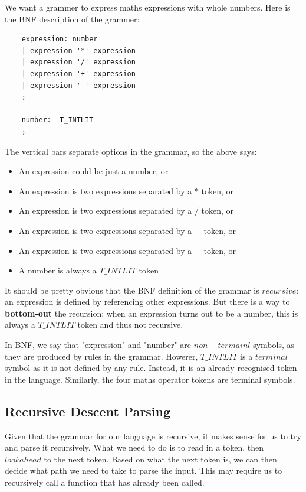 \documentclass[a4paper,12pt]{article}
\begin{document}
We want a grammer to express maths expressions with whole numbers. Here is the BNF description of the grammer:

\begin{lstlisting}
    expression: number
    | expression '*' expression
    | expression '/' expression
    | expression '+' expression
    | expression '-' expression
    ;

    number:  T_INTLIT
    ;
\end{lstlisting}

The vertical bars separate options in the grammar, so the above says:

\begin{itemize}
    \item An expression could be just a number, or
    \item An expression is two expressions separated by a $*$ token, or
    \item An expression is two expressions separated by a $/$ token, or
    \item An expression is two expressions separated by a $+$ token, or
    \item An expression is two expressions separated by a $-$ token, or
    \item A number is always a $T\_INTLIT$ token
\end{itemize}

It should be pretty obvious that the BNF definition of the grammar is $recursive$: an expression is defined by referencing other expressions. But there is a way to \textbf{bottom-out} the recursion: when an expression turns out to be a number, this is always a $T\_INTLIT$ token and thus not recursive.

In BNF, we say that "expression" and "number" are $non-termainl$ symbols, as they are produced by rules in the grammar. Howerer, $T\_INTLIT$ is a $terminal$ symbol as it is not defined by any rule. Instead, it is an already-recognised token in the language. Similarly, the four maths operator tokens are terminal symbols.

\subsection{Recursive Descent Parsing}

Given that the grammar for our language is recursive, it makes sense for us to try and parse it recursively. What we need to do is to read in a token, then $look ahead$ to the next token. Based on what the next token is, we can then decide what path we need to take to parse the input. This may require us to recursively call a function that has already been called.
\end{document}
